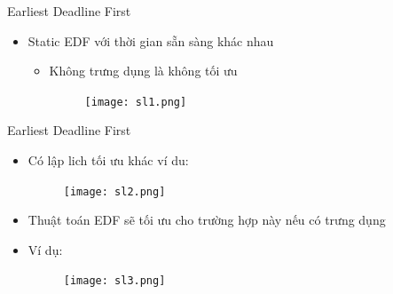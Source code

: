 \documentclass{beamer}
\newcommand{\bi}{\begin{itemize}}
\newcommand{\ei}{\end{itemize}}
\begin{document}
\begin{frame}{Earliest Deadline First}
\begin{itemize}
\item Static EDF với thời gian sẵn sàng khác nhau
\bi
\item Không trưng dụng là không tối ưu
\begin{figure}[h]
\begin{center}
\texttt{[image: sl1.png]}
\end{center}
\end{figure}
\ei
\end{itemize}
\end{frame}
\begin{frame}{Earliest Deadline First}
\begin{itemize}
\item Có lập lich tối ưu khác ví du:
\begin{figure}[h]
\begin{center}
\texttt{[image: sl2.png]}
\end{center}
\end{figure}
\item Thuật toán EDF sẽ tối ưu cho trường hợp này nếu có trưng dụng
\item Ví dụ:
\begin{figure}[h]
\begin{center}
\texttt{[image: sl3.png]}
\end{center}
\end{figure}
\end{itemize}
\end{frame}
\end{document}
